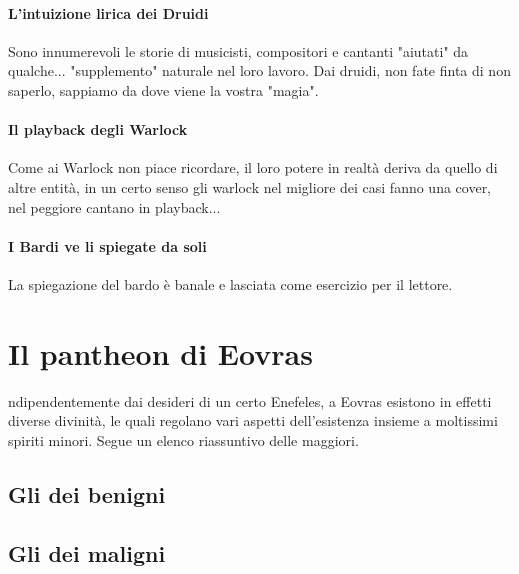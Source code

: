 \paragraph{L'intuizione lirica dei Druidi}Sono innumerevoli le storie di musicisti, compositori e cantanti "aiutati" da qualche... "supplemento" naturale nel loro lavoro. Dai druidi, non fate finta di non saperlo, sappiamo da dove viene la vostra "magia".
\paragraph{Il playback degli Warlock}Come ai Warlock non piace ricordare, il loro potere in realtà deriva da quello di altre entità, in un certo senso gli warlock nel migliore dei casi fanno una cover, nel peggiore cantano in playback...
\paragraph{I Bardi ve li spiegate da soli}La spiegazione del bardo è banale e lasciata come esercizio per il lettore.

\section{Il pantheon di Eovras}

ndipendentemente dai desideri di un certo Enefeles, a Eovras esistono in effetti diverse divinità, le quali regolano vari aspetti dell'esistenza insieme a moltissimi spiriti minori. Segue un elenco riassuntivo delle maggiori.

\subsection{Gli dei benigni}



\subsection{Gli dei maligni}
